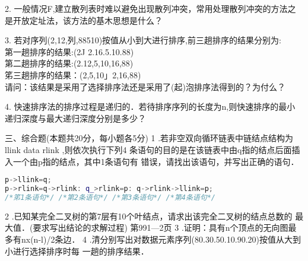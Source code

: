 2. 一般情况F,建立散列表时难以避免出现散列冲突，常用处理散列冲突的方法之 是开放定址法，该方法的基木思想是什么？

3. 若对序列(2,12,列,88510)按值从小到大进行排序,前三趟排序的结果分别为: \\
第一趟排序的结果:(2J 2.16.5.10.88) \\
第二趟排序的结果:(2.12,5,10,16,88) \\
笫三趟排序的结果：(2,5,10」2,16,88) \\
请问：该结果是采用了选择排序法还是采用了(起)泡排序法得到的？为付么？

4. 快速排序法的排序过程是递归的．若待排序序列的长度为n,则快速排序的最小 递归深度与最大递归深度分别是多少？

三、综合题(本题共20分，每小题各5分)
1	.若非空双向循环链表中链结点结构为llink data rlink ,则依次执行下列4
条语句的目的是在该链表中由q指的结点后面插入一个由p指的结点，其中1条语句有
错误，请找出该语句，并写出正确的语句．
\begin{lstlisting}[language=cpp]
p->llink=q;
p->rlink=q->rlink: q_>rlink=p: q->rlink->llink=p;
/*笫1条语句*/ /*第2条语句*/ /*第3条语句*/ /*第4条语句*/
\end{lstlisting}
2	.已知某完全二叉树的第7层有10个叶结点，请求出该完全二叉树的结点总数的 最大值．(要求写出结论的求解过程)
第991—2页
3	.证明：具有n个顶点的无向图最多有nx(n-l)/2条边．
4	.清分别写出对数据元素序列(80.30.50.10.90.20)按值从大到小进行选择排序时每
一趟的排序结果．

